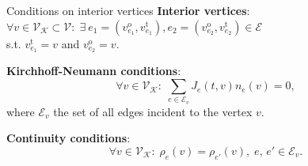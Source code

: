 \documentclass[9pt]{beamer}
\begin{document}
\begin{frame}{Conditions on interior vertices}
    \textbf{Interior vertices}: \\
    $\forall v \in \mathcal{V}_\mathcal{K} \subset \mathcal{V} \colon \; \exists \ e_1 = \left( v^{\operatorname{o}}_{e_1}, v^{\operatorname{t}}_{e_1} \right), e_2 = \left( v^{\operatorname{o}}_{e_2}, v^{\operatorname{t}}_{e_2} \right) \in \mathcal{E}$ \\ s.t. $v^{\operatorname{t}}_{e_1} = v$ and $v^{\operatorname{o}}_{e_2} = v$. \\

    \vspace{5mm} 

    \textbf{Kirchhoff-Neumann conditions}:
    \begin{equation*}
        \forall v \in \mathcal{V}_\mathcal{K} \colon \; \sum_{e\in \mathcal{E}_v} J_e \left( t,v \right)  n_e  \left( v \right) =0,
    \end{equation*}
    where $\mathcal{E}_v$ the set of all edges incident to the vertex $v$. \\

    \vspace{5mm}

    \textbf{Continuity conditions}:
    \begin{equation*}
        \forall v \in \mathcal{V}_\mathcal{K} \colon \; \rho_e \left( v \right)  = \rho_{e'} \left( v \right), \; e,\,e' \in \mathcal{E}_v.
    \end{equation*}
\end{frame}
\end{document}
